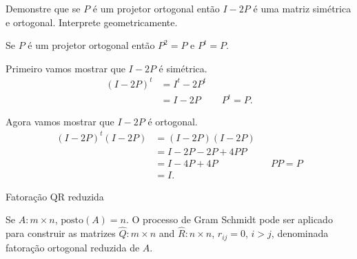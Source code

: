 \documentclass[a4paper,12pt, leqno, answers]{exam}
\begin{document}
\begin{questions}

    \question Demonstre que se $P$ \'{e} um projetor ortogonal ent\~{a}o $I - 2 P$ \'{e} uma matriz sim\'{e}trica e ortogonal. Interprete geometricamente.
    \begin{solution}
        Se $P$ \'{e} um projetor ortogonal ent\~{a}o $P^2 = P$ e $P^t = P$.

        Primeiro vamos mostrar que $I - 2 P$ \'{e} sim\'{e}trica.
        \begin{align*}
            \left( I - 2 P \right)^t &= I^t - 2 P^t \\
            &= I - 2 P && P^t = P.
        \end{align*}

        Agora vamos mostrar que $I - 2 P$ \'{e} ortogonal.
        \begin{align*}
            \left( I - 2 P \right)^t \left( I - 2 P \right) &= \left( I - 2 P \right) \left( I - 2 P \right) \\
            &= I - 2 P - 2 P + 4 P P \\
            &= I - 4 P + 4 P && P P = P \\
            &= I.
        \end{align*}
    \end{solution}
    
    \question Fatora\c{c}\~{a}o QR reduzida

    Se $A : m \times n$, $\text{posto}(A) = n$. O processo de Gram Schmidt pode ser aplicado para construir as matrizes $\hat{Q} : m \times n$ and $\hat{R} : n \times n$, $r_{ij} = 0$, $i > j$, denominada fatora\c{c}\~{a}o ortogonal reduzida de $A$. 
    

\end{questions}
\end{document}
